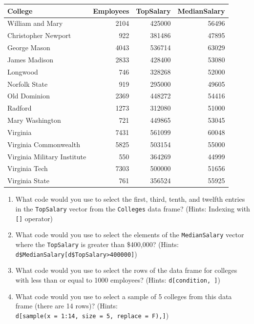 \documentclass[
]{book}
\providecommand{\tightlist}{%
  \setlength{\itemsep}{0pt}\setlength{\parskip}{0pt}}
\begin{document}
\begin{tabular}{l|r|r|r}
\hline
College & Employees & TopSalary & MedianSalary\\
\hline
William and Mary & 2104 & 425000 & 56496\\
\hline
Christopher Newport & 922 & 381486 & 47895\\
\hline
George Mason & 4043 & 536714 & 63029\\
\hline
James Madison & 2833 & 428400 & 53080\\
\hline
Longwood & 746 & 328268 & 52000\\
\hline
Norfolk State & 919 & 295000 & 49605\\
\hline
Old Dominion & 2369 & 448272 & 54416\\
\hline
Radford & 1273 & 312080 & 51000\\
\hline
Mary Washington & 721 & 449865 & 53045\\
\hline
Virginia & 7431 & 561099 & 60048\\
\hline
Virginia Commonwealth & 5825 & 503154 & 55000\\
\hline
Virginia Military Institute & 550 & 364269 & 44999\\
\hline
Virginia Tech & 7303 & 500000 & 51656\\
\hline
Virginia State & 761 & 356524 & 55925\\
\hline
\end{tabular}

\begin{enumerate}
\def\labelenumi{\arabic{enumi}.}
\tightlist
\item
  What code would you use to select the first, third, tenth, and twelfth entries in the \texttt{TopSalary} vector from the \texttt{Colleges} data frame? (Hints: Indexing with \texttt{{[}{]}} operator)
\item
  What code would you use to select the elements of the \texttt{MedianSalary} vector where the \texttt{TopSalary} is greater than \$400,000? (Hints: \texttt{d\$MedianSalary{[}d\$TopSalary\textgreater{}400000{]}})
\item
  What code would you use to select the rows of the data frame for colleges with less than or equal to 1000 employees? (Hints: \texttt{d{[}condition,\ {]}})
\item
  What code would you use to select a sample of 5 colleges from this data frame (there are 14 rows)? (Hints: \texttt{d{[}sample(x\ =\ 1:14,\ size\ =\ 5,\ replace\ =\ F),{]}})
\end{enumerate}
\end{document}
